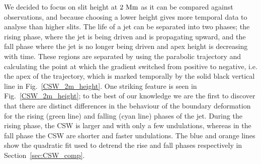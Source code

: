 %
We decided to focus on slit height at $2~\rm{Mm}$ as it can be compared against observations, and because choosing a lower height gives more temporal data to analyse than higher slits. The life of a jet can be separated into two phases; the rising phase, where the jet is being driven and is propagating upward, and the fall phase where the jet is no longer being driven and apex height is decreasing with time. These regions are separated by using the parabolic trajectory and calculating the point at which the gradient switched from positive to negative, i.e. the apex of the trajectory, which is marked temporally by the solid black vertical line in Fig.~\ref{CSW_2m_height}. One striking feature is seen in Fig.~\ref{CSW_2m_height}; to the best of our knowledge we are the first to discover that there are distinct differences in the behaviour of the boundary deformation for the rising (green line) and falling (cyan line) phases of the jet. During the rising phase, the CSW is larger and with only a few undulations,  whereas in the fall phase the CSW are shorter and faster undulations. The blue and orange lines show the quadratic fit used to detrend the rise and fall phases respectively in Section~\ref{sec:CSW_comp}.
